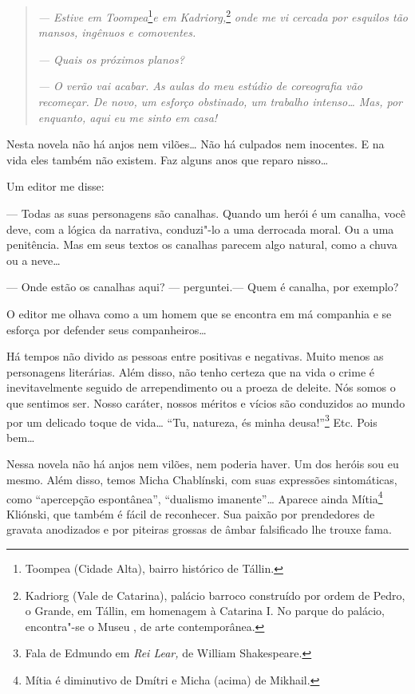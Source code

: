 \begin{quotation}
\emph{--- Estive em Toompea}\footnote{Toompea (Cidade Alta), bairro
  histórico de Tállin.}\emph{e em Kadriorg,}\footnote{Kadriorg (Vale de
  Catarina), palácio barroco construído por ordem de Pedro, o Grande, em
  Tállin, em homenagem à Catarina I. No parque do palácio, encontra"-se o
  Museu , de arte contemporânea.} \emph{onde me vi cercada por
esquilos tão mansos, ingênuos e comoventes.}

\emph{--- Quais os próximos planos?}

\emph{--- O verão vai acabar. As aulas do meu estúdio de coreografia vão
recomeçar. De novo, um esforço obstinado, um trabalho intenso\ldots{} Mas,
por enquanto, aqui eu me sinto em casa!}
\end{quotation}

Nesta novela não há anjos nem vilões\ldots{} Não há culpados nem inocentes. E
na vida eles também não existem. Faz alguns anos que reparo nisso\ldots{}

Um editor me disse:

--- Todas as suas personagens são canalhas. Quando um herói é um
canalha, você deve, com a lógica da narrativa, conduzi"-lo a uma
derrocada moral. Ou a uma penitência. Mas em seus textos os canalhas
parecem algo natural, como a chuva ou a neve\ldots{}

--- Onde estão os canalhas aqui? --- perguntei.--- Quem é canalha, por
exemplo?

O editor me olhava como a um homem que se encontra em má companhia e se
esforça por defender seus companheiros\ldots{}

Há tempos não divido as pessoas entre positivas e negativas. Muito menos
as personagens literárias. Além disso, não tenho certeza que na vida o
crime é inevitavelmente seguido de arrependimento ou a proeza de
deleite. Nós somos o que sentimos ser. Nosso caráter, nossos méritos e
vícios são conduzidos ao mundo por um delicado toque de vida\ldots{} ``Tu,
natureza, és minha deusa!''\footnote{Fala de Edmundo em \emph{Rei Lear,}
  de William Shakespeare.} Etc. Pois bem\ldots{}

Nessa novela não há anjos nem vilões, nem poderia haver. Um dos heróis
sou eu mesmo. Além disso, temos Micha Chablínski, com suas expressões
sintomáticas, como ``apercepção espontânea'', ``dualismo imanente''\ldots{}
Aparece ainda Mítia\footnote{Mítia é diminutivo de Dmítri e Micha
  (acima) de Mikhail.} Kliónski, que também é fácil de reconhecer. Sua
paixão por prendedores de gravata anodizados e por piteiras grossas de
âmbar falsificado lhe trouxe fama.

